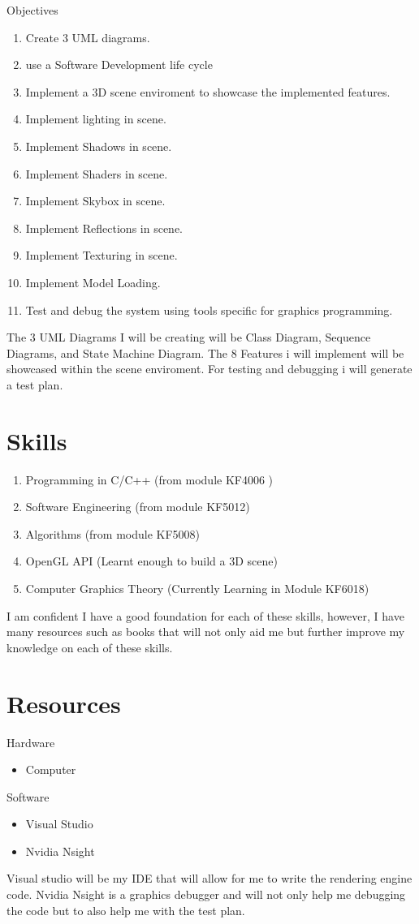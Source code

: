 \documentclass[]{article}
\begin{document}
Objectives
\begin{enumerate}
  \item Create 3 UML diagrams.
  \item use a Software Development life cycle
  \item Implement a 3D scene enviroment to showcase the implemented features.
  \item Implement lighting in scene.
  \item Implement Shadows in scene.
  \item Implement Shaders in scene.
  \item Implement Skybox in scene.
  \item Implement Reflections in scene.
  \item Implement Texturing in scene.
  \item Implement Model Loading.
  \item Test and debug the system using tools specific for graphics programming.  
\end{enumerate}
The 3 UML Diagrams I will be creating will be Class Diagram, Sequence Diagrams, and State Machine Diagram. The 8 Features i will implement will be showcased within the scene enviroment. For testing and debugging i will generate a test plan.
\section{Skills}
\begin{enumerate}
	\item Programming in C/C++ (from module KF4006 )
	\item Software Engineering (from module KF5012)
	\item Algorithms (from module KF5008) 
	\item OpenGL API (Learnt enough to build a 3D scene) 
	\item Computer Graphics Theory (Currently Learning in Module KF6018)
\end{enumerate}
I am confident I have a good foundation for each of these skills, however, I have many resources such as books that will not only aid me but further improve my knowledge on each of these skills. 
\section{Resources}
Hardware
\begin{itemize}
  \item Computer
  
\end{itemize}
Software
\begin{itemize}
  \item Visual Studio
  \item Nvidia Nsight
\end{itemize}
Visual studio will be my IDE that will allow for me to write the rendering engine code.
Nvidia Nsight is a graphics debugger and will not only help me debugging the code but to also help me with the test plan.
\end{document}
